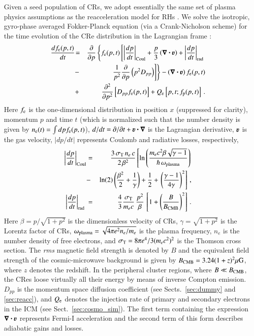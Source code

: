 \documentclass[fleqn,usenatbib,useAMS]{mnras}
\newcommand{\bcdot}{\ensuremath{%
  \mathchoice%
   {\mskip\thinmuskip\lower0.2ex\hbox{\scalebox{1.5}{$\cdot$}}\mskip\thinmuskip}}%
   {\mskip\thinmuskip\lower0.2ex\hbox{\scalebox{1.5}{$\cdot$}}\mskip\thinmuskip}%
   {\lower0.3ex\hbox{\scalebox{1.2}{$\cdot$}}}%
   {\lower0.3ex\hbox{\scalebox{1.2}{$\cdot$}}}%
}
\newcommand{\bvel}{\ensuremath{\boldsymbol{\varv}}}
\newcommand{\bnabla}{\ensuremath{\boldsymbol{\nabla}}}
\begin{document}
Given a seed population of CRs, we adopt essentially the same set of
plasma physics assumptions as the reacceleration model for RHs
\citep{brunetti07,brunetti11}. We solve the isotropic, gyro-phase
averaged Fokker-Planck equation (via a Crank-Nicholson scheme) for the
time evolution of the CRe distribution in the Lagrangian frame
\citep{brunetti07,brunetti11}:
\begin{eqnarray}
{{d f_{\rmn{e}}(p,t)}\over{d t}} &\!=&
\frac{\partial}{\partial p}
\left\{
f_{\rmn{e}}(p,t)\left[
\left|\frac{dp}{dt}\right|_{\rm Coul} 
+ \frac{p}{3}\left(\bnabla\bcdot \bvel\right)
+ \left|\frac{dp}{dt}\right|_{\rm rad}\right.\right.
\nonumber\\
&-& \left.\left.{1\over{p^2}}{{\partial }\over{\partial p}}\left(p^2 D_{pp}\right) 
\right]\right\} - \left(\bnabla\bcdot \bvel\right) f_{\rmn{e}}(p,t)
\nonumber\\
&+& {{\partial^2 }\over{\partial p^2}}
\left[
D_{pp} f_{\rmn{e}}(p,t) \right]+ Q_{\rmn{e}}\left[p,t;f_{\rmn{p}}(p,t)\right]   \, .
\label{elettroni}
\end{eqnarray}
Here $f_{{\mathrm{e}}}$ is the one-dimensional distribution in position $x$
(suppressed for clarity), momentum $p$ and time $t$ (which is
normalized such that the number density is given by
$n_{{\mathrm{e}}}(t)=\int d p f_{{\mathrm{e}}}(p,t)$), $d/dt=\partial/\partial
t+\bvel\bcdot\bnabla$ is the Lagrangian derivative, $\bvel$ is the gas
velocity, $|dp/dt|$ represents Coulomb
\citep[Coul,][]{1972Phy....60..145G} and radiative
\citep[rad,][]{1979rpa..book.....R} losses, respectively,
\begin{eqnarray}
   \left|\frac{dp}{dt}\right|_{\rm Coul} &=& \frac{3\,\sigma_{\mathrm{T}}\,n_e\,c}{2\, \beta^2}
  \left[\ln\left(\frac{m_e c^2 \beta \sqrt{\gamma-1}}{\hbar\,\omega_{\mathrm{plasma}}}\right)\right.\nonumber \\
    &-&\ln(2)\left(\frac{\beta^2}{2}+\frac{1}{\gamma}\right)+\frac{1}{2}+
    \left.\left(\frac{\gamma-1}{4\gamma}\right)^2\right]\,, \\
  \left|\frac{dp}{dt}\right|_{\rm rad~} &=& \frac{4}{3}\frac{\sigma_{\mathrm{T}}}{m_ec}\,
  \frac{p^2}{\beta}\,\left[1+\left(\frac{B}{B_{\mathrm{CMB}}}\right)^2\right]\,.
\end{eqnarray}
Here $\beta = p/\sqrt{1+p^2}$ is the dimensionless velocity of CRs,
$\gamma=\sqrt{1+p^2}$ is the Lorentz factor of CRs,
$\omega_{\mathrm{plasma}} = \sqrt{4\pi e^2 n_e / m_e}$ is the plasma
frequency, $n_e$ is the number density of free electrons, and
$\sigma_{\mathrm{T}}= 8\pi e^4/3(m_e c^2)^2$ is the Thomson cross
section. The {\it rms} magnetic field strength is denoted by $B$ and
the equivalent field strength of the cosmic-microwave background is
given by $B_{\mathrm{CMB}} = 3.24 (1 + z)^2\mu{\mathrm{G}}$, where $z$ denotes
the redshift. In the peripheral cluster regions, where $B \ll
B_{\mathrm{CMB}}$, the CRes loose virtually all their energy by means of
inverse Compton emission. $D_{pp}$ is the momentum space diffusion
coefficient (see Sects.~\ref{sec:dummy} and \ref{sec:reacc}), and
$Q_{{\mathrm{e}}}$ denotes the injection rate of primary and secondary
electrons in the ICM (see Sect.~\ref{sec:cosmo_sim}). The first term
containing the expression $\bnabla\bcdot \bvel$ represents Fermi-I
acceleration and the second term of this form describes adiabatic
gains and losses.
\end{document}

